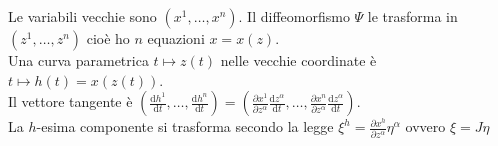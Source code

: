 \documentclass[11pt,a4paper]{article}
\newcommand{\de}{\mathrm d}
\newcommand{\fracd}[2]{\frac{\de #1}{\de #2}}
\newcommand{\fracp}[2]{\frac{\partial #1}{\partial #2}}
\begin{document}
Le variabili vecchie sono $(x^1, \ldots, x^n)$. Il diffeomorfismo $\Psi$ le trasforma in $(z^1, \ldots, z^n)$ cioè ho $n$ equazioni $x = x(z)$.\\
Una curva parametrica $t \mapsto z(t)$ nelle vecchie coordinate è $t \mapsto h(t) = x(z(t))$.\\
Il vettore tangente è $(\fracd{h^1}{t}, \ldots, \fracd{h^n}{t}) = (\fracp{x^1}{z^\alpha} \fracd{z^\alpha}t, \ldots, \fracp{x^n}{z^\alpha} \fracd{z^\alpha}t)$.\\
La $h$-esima componente si trasforma secondo la legge $\xi^h = \fracp{x^h}{z^\alpha} \eta^\alpha$ ovvero $\xi = J \eta$
\end{document}

